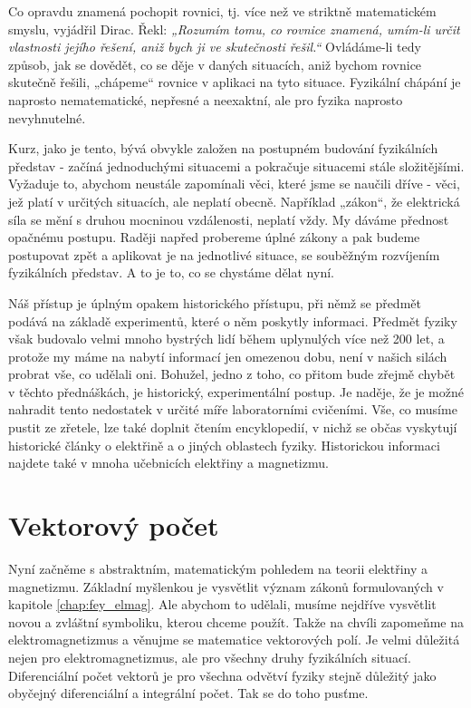 {    Co opravdu znamená pochopit rovnici, tj. více než ve stri\-ktně matematickém smyslu, vyjádřil 
    Dirac. Řekl: \emph{„Rozumím tomu, co rovnice znamená, umím-li určit vlastnosti jejího řešení, 
    aniž bych ji ve skutečnosti řešil.“} Ovládáme-li tedy způsob, jak se dovědět, co se děje v 
    daných  situacích, aniž bychom rovnice skutečně řešili, „chápeme“ rovnice v aplikaci na tyto 
    situace. Fyzikální chápání je naprosto nematematické, nepřesné a neexaktní, ale pro fyzika 
    naprosto nevyhnutelné.
    
    Kurz, jako je tento, bývá obvykle založen na postupném budování fyzikálních představ - začíná 
    jednoduchými situacemi a pokračuje situacemi stále složitějšími. Vyžaduje to, abychom neustále 
    zapomínali věci, které jsme se naučili dříve - věci, jež platí v určitých situacích, ale 
    neplatí obecně. Například „zákon“, že elektrická síla se mění s druhou mocninou vzdálenosti, 
    neplatí vždy. My dáváme přednost opačnému postupu. Raději napřed probereme úplné zákony a pak 
    budeme postupovat zpět a aplikovat je na jednotlivé situace, se souběžným rozvíjením 
    fyzikálních představ. A to je to, co se chystáme dělat nyní.
    
    Náš přístup je úplným opakem historického přístupu, při němž se předmět podává na základě 
    experimentů, které o něm poskytly informaci. Předmět fyziky však budovalo velmi mnoho bystrých 
    lidí během uplynulých více než 200 let, a protože my máme na nabytí informací jen omezenou 
    dobu, není v našich silách probrat vše, co udělali oni. Bohužel, jedno z toho, co přitom bude 
    zřejmě chybět v těchto přednáškách, je historický, experimentální postup. Je naděje, že je 
    možné nahradit tento nedostatek v určité míře laboratorními cvičeními. Vše, co musíme pustit ze 
    zřetele, lze také doplnit čtením encyklopedií, v nichž se občas vyskytují historické 
    články o elektřině a o jiných oblastech fyziky. Historickou informaci najdete také v mnoha 
    učebnicích elektřiny a magnetizmu.
    
  \section{Vektorový počet}
    Nyní začněme s abstraktním, matematickým pohledem na teorii elektřiny a magnetizmu. Základní 
    myšlenkou je vysvětlit význam zákonů formulovaných v kapitole \ref{chap:fey_elmag}. Ale abychom 
    to udělali, musíme nejdříve vysvětlit novou a zvláštní symboliku, kterou chceme použít. Takže 
    na chvíli zapomeňme na elektromagnetizmus a věnujme se matematice vektorových polí. Je velmi 
    důležitá nejen pro elektromagnetizmus, ale pro všechny druhy fyzikálních situací. Diferenciální 
    počet vektorů je pro všechna odvětví fyziky stejně důležitý jako obyčejný diferenciální a 
    integrální počet. Tak se do toho pusťme.

}

